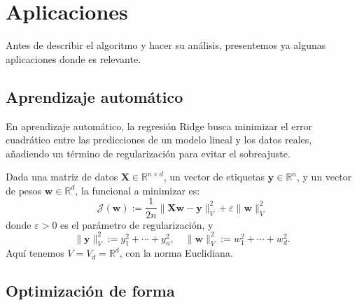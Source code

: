 \documentclass[12pt]{book}
\theoremstyle{definition}
\theoremstyle{plain}
\theoremstyle{remark}
\begin{document}
\section{Aplicaciones}

Antes de describir el algoritmo y hacer su análisis, presentemos ya algunas aplicaciones donde es relevante.

\subsection{Aprendizaje autom\'atico} 
\label{sub:aa}

En aprendizaje automático, la regresión Ridge busca minimizar el error cuadrático entre las predicciones de un modelo lineal y los datos reales, añadiendo un término de regularización %
para evitar el sobreajuste.

Dada una matriz de datos $ \mathbf{X} \in \mathbb{R}^{n \times d} $, un vector de etiquetas $ \mathbf{y} \in \mathbb{R}^n $, y un vector de pesos $ \mathbf{w} \in \mathbb{R}^d $, la funcional a minimizar es:
$$
\mathcal{J}(\mathbf{w}) := \frac{1}{2n} \| \mathbf{X}\mathbf{w} - \mathbf{y}\|_V^2 + \varepsilon \|\mathbf{w}\|_V^2
$$
donde $ \varepsilon > 0 $ es el parámetro de regularización, y
\[
\|  \mathbf{y}\|_V^2 := y_1^2 + \cdots + y_n^2, \quad
\|\mathbf{w}\|_V^2 := w_1^2 + \cdots + w_d^2. 
\]
Aquí tenemos $V = V_d = \mathbb{R}^d$, con la norma Euclidiana. %

\subsection{Optimización de forma} %
\end{document}
